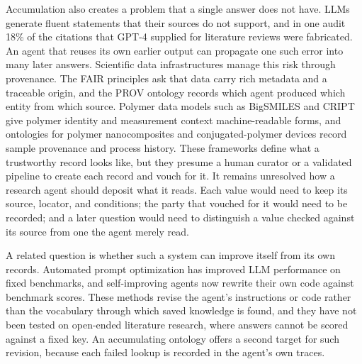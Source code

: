 \documentclass[journal=mamobx,manuscript=article]{achemso}
\begin{document}
Accumulation also creates a problem that a single answer does not have.
LLMs generate fluent statements that their sources do not support,\cite{Ji2023Survey} and in one audit 18\% of the citations that GPT-4 supplied for literature reviews were fabricated.\cite{Walters2023Fabrication}
An agent that reuses its own earlier output can propagate one such error into many later answers.
Scientific data infrastructures manage this risk through provenance.
The FAIR principles ask that data carry rich metadata and a traceable origin,\cite{Wilkinson2016FAIR} and the PROV ontology records which agent produced which entity from which source.\cite{Lebo2013PROVO}
Polymer data models such as BigSMILES and CRIPT give polymer identity and measurement context machine-readable forms,\cite{Lin2019BigSMILES,Walsh2023CRIPT} and ontologies for polymer nanocomposites and conjugated-polymer devices record sample provenance and process history.\cite{McCusker2020NanoMine,Liu2023Ontology}
These frameworks define what a trustworthy record looks like, but they presume a human curator or a validated pipeline to create each record and vouch for it.
It remains unresolved how a research agent should deposit what it reads.
Each value would need to keep its source, locator, and conditions; the party that vouched for it would need to be recorded; and a later question would need to distinguish a value checked against its source from one the agent merely read.

A related question is whether such a system can improve itself from its own records.
Automated prompt optimization has improved LLM performance on fixed benchmarks,\cite{Yang2023OPRO,Khattab2023DSPy,Yuksekgonul2025TextGrad} and self-improving agents now rewrite their own code against benchmark scores.\cite{Zhang2025Darwin}
These methods revise the agent's instructions or code rather than the vocabulary through which saved knowledge is found, and they have not been tested on open-ended literature research, where answers cannot be scored against a fixed key.
An accumulating ontology offers a second target for such revision, because each failed lookup is recorded in the agent's own traces.
\end{document}
